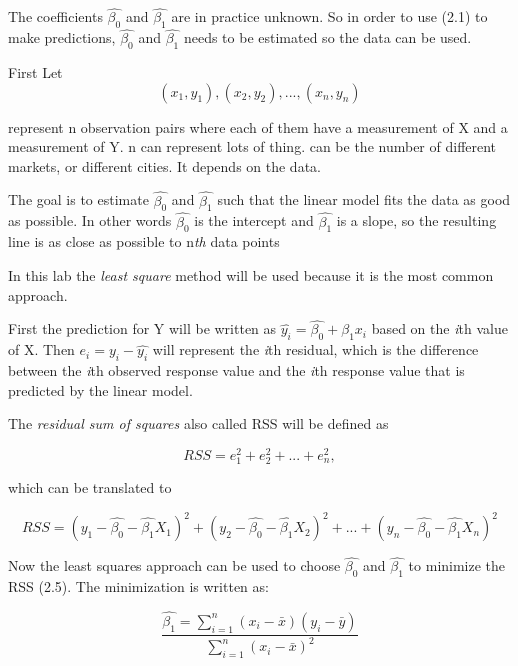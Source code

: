 The coefficients 
$\hat{\beta_0}$ and  $\hat{\beta_1}$ are in practice unknown. So in order to use (2.1) to make predictions, $\hat{\beta_0}$ and  $\hat{\beta_1}$ needs to be estimated so the data can be used. 

First Let 
\begin{equation}
(x_1, y_1), (x_2, y_2),..., (x_n, y_n)
\end{equation}

represent n observation pairs where each of them have a measurement of X and a measurement of Y. n can represent lots of thing. can be the number of different markets, or different cities. It depends on the data.

The goal is to estimate $\hat{\beta_0}$ and  $\hat{\beta_1}$ such that the linear model fits the data as good as possible. In other words $\hat{\beta_0}$ is the intercept and  $\hat{\beta_1}$ is a slope, so the resulting line is as close as possible to n\emph{th} data points

In this lab the \emph{least square} method will be used because it is the most common approach. 

First the prediction for Y will be written as $\hat{y_i} = \hat{\beta_0} + \hat{\beta_1} x_i$ based on the \emph{i}th value of X.
Then $e_i = y_i - \hat{y_i}$ will represent the \emph{i}th residual, which is the difference between the \emph{i}th observed response value and the \emph{i}th response value that is predicted by the linear model.

The \emph{residual sum of squares} also called RSS will be defined as

\begin{equation}
RSS = e^2_1 + e^2_2 + ... + e^2_n,
\end{equation}

which can be translated to

\begin{equation}
RSS = (y_1 - \hat{\beta_0} - \hat{\beta_1}X_1)^2 + (y_2 - \hat{\beta_0} - \hat{\beta_1}X_2)^2 + ... + (y_n - \hat{\beta_0} - \hat{\beta_1}X_n)^2
\end{equation}

Now the least squares approach can be used to choose $\hat{\beta_0}$ and $\hat{\beta_1}$ to minimize the RSS (2.5).
The minimization is written as:

\begin{equation}
\dfrac{\hat{\beta_1} = \sum\limits_{i=1}^n(x_i - \bar{x})(y_i - \bar{y})}{\sum\limits_{i=1}^n(x_i - \bar{x})^2}
\end{equation}

